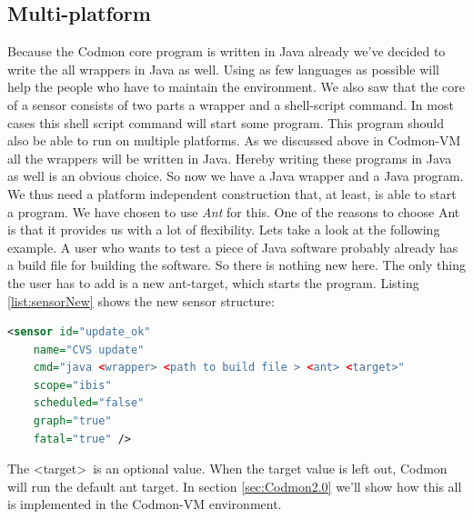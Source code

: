 \documentclass{article}
\newcommand{\project}{Codmon-VM}
\begin{document}
\subsection{Multi-platform}
\label{road:multi}
Because the Codmon core program is written in Java already we've decided to write the all wrappers in Java as well. Using as few languages as possible will help the people who have to maintain the 
environment. We also saw that the core of a sensor consists of two parts a wrapper and a shell-script command. In most cases this shell script command will start some program. This program should also 
be able to run on multiple platforms. As we discussed above in \project{} all the wrappers will be written in Java. Hereby writing these programs in Java as well is an obvious choice. So now we have a Java wrapper
and a Java program. We thus need a platform independent construction that, at least, is able to start a program. We have chosen to use \emph{Ant} for this. One of the reasons to choose Ant is that it provides 
us with a lot of flexibility. Lets take a look at the following example. A user who wants to test a piece of Java software probably already has a build file for building the software. So there is nothing new 
here. The only thing the user has to add is a new ant-target, which starts the program. Listing \ref{list:sensorNew} shows the new sensor structure:

\begin{lstlisting}[frame=shadowbox, language=XML,showstringspaces=false]
 <sensor id="update_ok" 
    name="CVS update" 
    cmd="java <wrapper> <path to build file > <ant> <target>" 
    scope="ibis" 
    scheduled="false" 
    graph="true" 
    fatal="true" />
\end{lstlisting}

The \textless target\textgreater \ is an optional value. When the target value is left out, Codmon will run the default ant target. In section \ref{sec:Codmon2.0} we'll show how this all is implemented in the 
\project{} environment.\\
\end{document}
